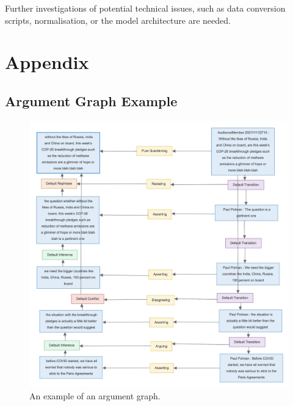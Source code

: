 \documentclass[11pt]{article}
\begin{document}
Further investigations of potential technical issues, such as data conversion scripts, normalisation, or the model architecture are needed.





\section{Appendix}

\subsection{Argument Graph Example}
\begin{figure}
    \centering
    \includegraphics[width=1.0\textwidth]{figures/argument_map.png}
    \caption{An example of an argument graph.}\label{fig:arg_graph}
\end{figure}
\end{document}
